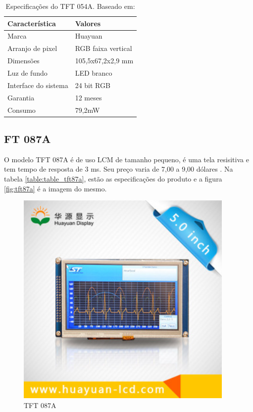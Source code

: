 \begin{table}[ht]
\caption{Especificações do TFT 054A. Baseado em: \cite{tft}}
\centering
\begin{tabular}{| l |  p{10cm} |}
\hline
Característica & Valores \\
\hline
Marca & Huayuan \\
\hline
Arranjo de pixel & RGB faixa vertical \\
\hline
Dimensões & 105,5x67,2x2,9 mm \\
\hline
Luz de fundo & LED branco \\
\hline
Interface do sistema & 24 bit RGB \\
\hline
Garantia & 12 meses \\
\hline
Consumo & 79,2mW \\
\hline
\end{tabular}
\label{table:table_tela_resistiva}
\end{table}


\subsection{FT 087A}
O modelo TFT 087A é de uso LCM de tamanho pequeno, é uma tela resisitiva
e tem tempo de resposta de 3 ms. Seu preço varia de 7,00 a 9,00 dólares
\cite{monitor_lcd}.  Na tabela \ref{table:table_tft87a}, estão as especificações
do produto e a figura \ref{fig:tft87a} é a imagem do mesmo.


\begin{figure}[h]
  \centering
  \includegraphics[width=400px, scale=1]{figuras/tela_87a}
  \caption{TFT 087A \cite{monitor_lcd}}
\label{fig:tela_87a}
\end{figure}


